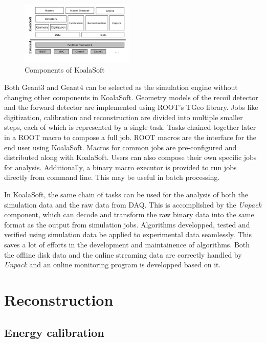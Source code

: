\documentclass[number,5p]{elsarticle}
\begin{document}
\begin{figure}[htbp]
  \centering
  \includegraphics[width=0.48\textwidth]{./koalasoft_components.png}
  \caption{Components of KoalaSoft}
  \label{fig:koalasoft}
\end{figure}

Both Geant3 and Geant4 can be selected as the simulation engine without changing other components in KoalaSoft.
Geometry models of the recoil detector and the forward detector are implemented using ROOT's TGeo library.
Jobs like digitization, calibration and reconstruction are divided into multiple smaller steps, each of which is represented by a single task.
Tasks chained together later in a ROOT macro to compose a full job. 
ROOT macros are the interface for the end user using KoalaSoft.
Macros for common jobs are pre-configured and distributed along with KoalaSoft.
Users can also compose their own specific jobs for analysis.
Additionally, a binary macro executor is provided to run jobs directly from command line. This may be useful in batch processing.

In KoalaSoft, the same chain of tasks can be used for the analysis of both the simulation data and the raw data from DAQ.
This is accomplished by the \emph{Unpack} component, which can decode and transform the raw binary data into the same format as the output from simulation jobs.
Algorithms developped, tested and verified using simulation data be applied to experimental data seamlessly.
This saves a lot of efforts in the development and maintainence of algorithms.
Both the offline disk data and the online streaming data are correctly handled by \emph{Unpack} and an online monitoring program is developped based on it.

\section{Reconstruction}
\label{sec:reconstruction}

\subsection{Energy calibration}
\label{sec:calibration}
\end{document}
